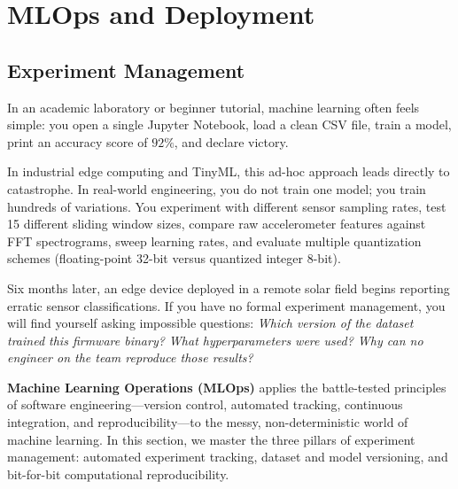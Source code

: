 \chapter{MLOps and Deployment}\label{ch:mlops_deployment}
\section{Experiment Management}\label{sec:experiment_management}

In an academic laboratory or beginner tutorial, machine learning often feels simple: you open a single Jupyter Notebook, load a clean CSV file, train a model, print an accuracy score of $92\%$, and declare victory. 

In industrial edge computing and TinyML, this ad-hoc approach leads directly to catastrophe. In real-world engineering, you do not train one model; you train hundreds of variations. You experiment with different sensor sampling rates, test 15 different sliding window sizes, compare raw accelerometer features against FFT spectrograms, sweep learning rates, and evaluate multiple quantization schemes (floating-point 32-bit versus quantized integer 8-bit).

Six months later, an edge device deployed in a remote solar field begins reporting erratic sensor classifications. If you have no formal experiment management, you will find yourself asking impossible questions: \textit{Which version of the dataset trained this firmware binary? What hyperparameters were used? Why can no engineer on the team reproduce those results?}

\textbf{Machine Learning Operations (MLOps)} applies the battle-tested principles of software engineering—version control, automated tracking, continuous integration, and reproducibility—to the messy, non-deterministic world of machine learning. In this section, we master the three pillars of experiment management: automated experiment tracking, dataset and model versioning, and bit-for-bit computational reproducibility.

